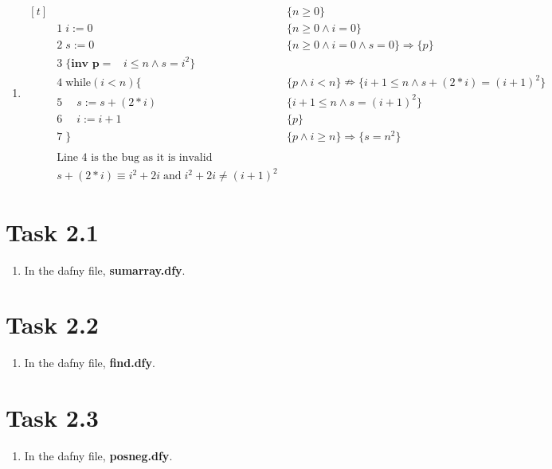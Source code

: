 \documentclass{article}
\newcommand{\answer}{\item[]} %
\begin{document}
	\begin{enumerate}[label={(\alph*)}]
		
		\answer
		$\begin{aligned}[t]
			&\qquad \qquad \qquad \qquad \qquad \qquad \qquad \qquad &\{n \geq 0\} \\
			&1\; i := 0 &\{n \geq 0 \land i = 0\} \\
			&2\; s := 0 &\{n \geq 0 \land i = 0 \land s = 0\} \Rightarrow \{p\} \\
			&3\; \{\textbf{inv p} = \; \; \; i \leq n \land s = i^2\} \\
			&4\; \text{while}(i < n)\{ &\{p \land i < n\} \nRightarrow \{i + 1 \leq n \land s + (2 * i) = (i + 1)^2\} \\
			&5\; \quad s := s + (2 * i) &\{i + 1 \leq n \land s = (i + 1)^2\} \\
			&6\; \quad i := i + 1 &\{p\} \\
			&7\; \} &\{p \land i \geq n\} \Rightarrow \{s = n^2\} \\
			&\\
			&\text{Line 4 is the bug as it is invalid} \\
			&s + (2 * i) \equiv i^2 + 2i \; \text{and} \; i^2 + 2i \neq (i + 1)^2
		\end{aligned}$
		
	\end{enumerate}
	
	\section{Task 2.1}
		\begin{enumerate}[label = {(\alph*)}]
			
			\answer In the dafny file, \textbf{sumarray.dfy}.
			
		\end{enumerate}
	
	\section{Task 2.2}
		\begin{enumerate}[label = {(\alph*)}]
			
			\answer In the dafny file, \textbf{find.dfy}.
			
		\end{enumerate}
	
	\section{Task 2.3}
	\begin{enumerate}[label = {(\alph*)}]
		
		\answer In the dafny file, \textbf{posneg.dfy}.
		
	\end{enumerate}
	
\end{document}
